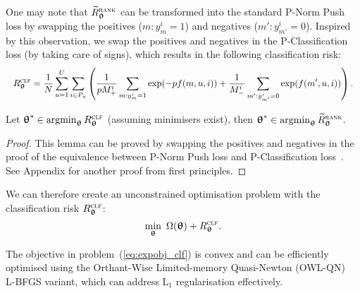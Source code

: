 One may note that $\widetilde R_{{\bm{\uptheta}}}^{\textsc{rank}}$ can be transformed into the standard P-Norm Push loss by swapping the
positives ($m: y_m^i = 1$) and negatives ($m': y_{m'}^i = 0$). %
Inspired by this observation, we swap the positives and negatives in the P-Classification loss (by taking care of signs),
which results in the following classification risk:
\begin{equation*}
\resizebox{\linewidth}{!}{$\displaystyle
R_{\upthetabm}^{\textsc{clf}}
= \frac{1}{N} \sum_{u=1}^U \sum_{i \in P_u} \left(
  \frac{1}{p M_+^i} \sum_{m: y_m^i = 1} \exp(-p f(m, u, i))
  + \frac{1}{M_-^i} \sum_{m': y_{m'}^i = 0} \exp(f(m', u, i)) \right).
$}
\end{equation*}

\begin{lemma}
\label{lm:rank2clf}
Let ${\bm{\uptheta}}^* \in \operatorname*{argmin}_{{\bm{\uptheta}}} R_{{\bm{\uptheta}}}^{\textsc{clf}}$ (assuming minimisers exist),
then ${\bm{\uptheta}}^* \in \operatorname*{argmin}_{{\bm{\uptheta}}} \widetilde R_{{\bm{\uptheta}}}^{\textsc{rank}}$.
\end{lemma}

\begin{proof}
This lemma can be proved by swapping the positives and negatives in the proof of 
the equivalence between P-Norm Push loss and P-Classification loss~\cite{ertekin2011equivalence}.
See Appendix for another proof from first principles.
\end{proof}

We can therefore create an unconstrained optimisation problem %
with the classification risk $R_{{\bm{\uptheta}}}^{\textsc{clf}}$:
\begin{equation}
\label{eq:expobj_clf}
\min_{\bm{\uptheta}} \ \Omega({\bm{\uptheta}}) + R_{{\bm{\uptheta}}}^{\textsc{clf}}.
\end{equation}

The objective in problem~(\ref{eq:expobj_clf}) is convex and can be efficiently optimised using the 
Orthant-Wise Limited-memory Quasi-Newton (OWL-QN)~\cite{andrew2007scalable} L-BFGS variant,
which can address L$_1$ regularisation effectively.

